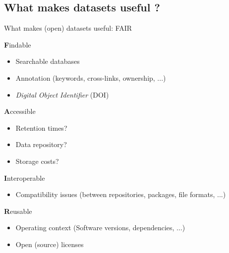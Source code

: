 \documentclass[10pt,compress,serif,aspectratio=169]{beamer}
\begin{document}
\subsection{What makes datasets useful ?}
\begin{frame}[t]{What makes (open) datasets useful: FAIR}

  \textbf{F}indable
  \begin{itemize}
    \item Searchable databases
    \item Annotation (keywords, cross-links, ownership, ...)
    \item \textit{Digital Object Identifier} (DOI)
  \end{itemize}
\vfill
  \textbf{A}ccessible
  \begin{itemize}
    \item Retention times?
    \item Data repository?
    \item Storage costs?   
  \end{itemize}
  \vfill
  \textbf{I}nteroperable
  \begin{itemize}
  \item Compatibility issues (between repositories, packages, file formats, ...)
  \end{itemize}
\vfill
  \textbf{R}eusable
  \begin{itemize}
    \item Operating context (Software versions, dependencies, ...)
    \item Open (source) licenses
  \end{itemize}

\end{frame}

\end{document}
